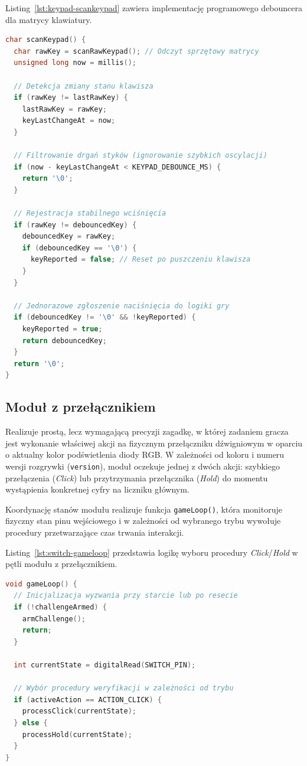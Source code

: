 \documentclass{SGGW-thesis}
\begin{document}
Listing~\ref{lst:keypad-scankeypad} zawiera implementację programowego debouncera dla matrycy klawiatury.
\begin{lstlisting}[language=C++, caption={Nieblokujący odczyt klawiatury z programowym debouncingiem (Keypad.ino)}, label={lst:keypad-scankeypad}]
char scanKeypad() {
  char rawKey = scanRawKeypad(); // Odczyt sprzętowy matrycy
  unsigned long now = millis();

  // Detekcja zmiany stanu klawisza
  if (rawKey != lastRawKey) {
    lastRawKey = rawKey;
    keyLastChangeAt = now;
  }

  // Filtrowanie drgań styków (ignorowanie szybkich oscylacji)
  if (now - keyLastChangeAt < KEYPAD_DEBOUNCE_MS) {
    return '\0';
  }

  // Rejestracja stabilnego wciśnięcia
  if (rawKey != debouncedKey) {
    debouncedKey = rawKey;
    if (debouncedKey == '\0') {
      keyReported = false; // Reset po puszczeniu klawisza
    }
  }

  // Jednorazowe zgłoszenie naciśnięcia do logiki gry
  if (debouncedKey != '\0' && !keyReported) {
    keyReported = true;
    return debouncedKey;
  }
  return '\0';
}
\end{lstlisting}


\subsection{Moduł z przełącznikiem} Realizuje prostą, lecz wymagającą precyzji zagadkę, w której zadaniem gracza jest wykonanie właściwej akcji na fizycznym przełączniku dźwigniowym w oparciu o aktualny kolor podświetlenia diody RGB. W zależności od koloru i numeru wersji rozgrywki (\texttt{version}), moduł oczekuje jednej z dwóch akcji: szybkiego przełączenia (\textit{Click}) lub przytrzymania przełącznika (\textit{Hold}) do momentu wystąpienia konkretnej cyfry na liczniku głównym.

Koordynację stanów modułu realizuje funkcja \texttt{gameLoop()}, która monitoruje fizyczny stan pinu wejściowego i w zależności od wybranego trybu wywołuje procedury przetwarzające czas trwania interakcji.

Listing~\ref{lst:switch-gameloop} przedstawia logikę wyboru procedury \textit{Click}/\textit{Hold} w pętli modułu z przełącznikiem.
\begin{lstlisting}[language=C++, caption={Główna pętla logiczna modułu z przełącznikiem (Switch.ino)}, label={lst:switch-gameloop}]
void gameLoop() {
  // Inicjalizacja wyzwania przy starcie lub po resecie
  if (!challengeArmed) {
    armChallenge();
    return;
  }

  int currentState = digitalRead(SWITCH_PIN);

  // Wybór procedury weryfikacji w zależności od trybu
  if (activeAction == ACTION_CLICK) {
    processClick(currentState);
  } else {
    processHold(currentState);
  }
}
\end{lstlisting}
\end{document}
